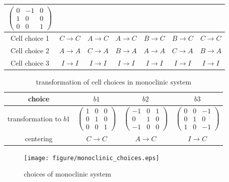 \begin{table}[htb]
\begin{tabular}{c|cccccc}
      $\begin{pmatrix} 0&-1&0 \\ 1&0&0 \\ 0&0&1 \end{pmatrix}$ \\
    \hline
    Cell choice 1 & $C \to C$ & $A \to C$ & $A \to C$ & $B \to C$ & $B \to C$ & $C \to C$ \\
    Cell choice 2 & $A \to A$ & $C \to A$ & $B \to A$ & $A \to A$ & $C \to A$ & $B \to A$ \\
    Cell choice 3 & $I \to I$ & $I \to I$ & $I \to I$ & $I \to I$ & $I \to I$ & $I \to I$ \\
    \hline\hline
  \end{tabular}
\end{table}

\begin{table}[htb]
  \centering
  \caption{transformation of cell choices in monoclinic system}
  \label{table-monoclinic-cellchoice}
  \begin{tabular}{c|ccc}
    \hline\hline
    choice                 & $b1$                                                & $b2$                                                  & $b3$                                                  \\
    \hline
    transformation to $b1$ & $\begin{pmatrix} 1&0&0\\0&1&0\\0&0&1 \end{pmatrix}$ & $\begin{pmatrix} -1&0&1\\0&1&0\\-1&0&0 \end{pmatrix}$ & $\begin{pmatrix} 0&0&-1\\0&1&0\\1&0&-1 \end{pmatrix}$ \\
    \hline
    centering              & $C \to C$                                           & $A \to C$                                             & $I \to C$                                             \\
    \hline\hline
  \end{tabular}
\end{table}

\begin{figure}[htb]
  \centering
  \texttt{[image: figure/monoclinic\_choices.eps]}
  \caption{choices of monoclinic system}
  \label{fig:monoclinic-choices}
\end{figure}

